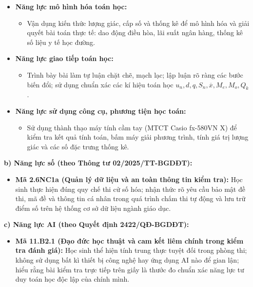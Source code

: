 \documentclass[12pt, a4paper]{article}
\begin{document}
\begin{itemize}[leftmargin=1.5em]
\begin{itemize}
        \item Đọc hiểu bảng tần số ghép nhóm, xác định nhóm chứa trung vị, tứ phân vị, mốt và tính toán chính xác giá trị bằng công thức nội suy.
        \item Quản lý và phân bổ thời gian làm bài thi 90 phút hiệu quả giữa phần trắc nghiệm (70\%) và tự luận (30\%).
    \end{itemize}
    \item \textbf{Năng lực mô hình hóa toán học:}
    \begin{itemize}
        \item Vận dụng kiến thức lượng giác, cấp số và thống kê để mô hình hóa và giải quyết bài toán thực tế: dao động điều hòa, lãi suất ngân hàng, thống kê số liệu y tế học đường.
    \end{itemize}
    \item \textbf{Năng lực giao tiếp toán học:}
    \begin{itemize}
        \item Trình bày bài làm tự luận chặt chẽ, mạch lạc; lập luận rõ ràng các bước biến đổi; sử dụng chuẩn xác các kí hiệu toán học $u_n, d, q, S_n, \overline{x}, M_e, M_o, Q_k$.
    \end{itemize}
    \item \textbf{Năng lực sử dụng công cụ, phương tiện học toán:}
    \begin{itemize}
        \item Sử dụng thành thạo máy tính cầm tay (MTCT Casio fx-580VN X) để kiểm tra kết quả tính toán, bấm máy giải phương trình, tính giá trị lượng giác và các số đặc trưng thống kê.
    \end{itemize}
\end{itemize}

\textbf{b) Năng lực số (theo Thông tư 02/2025/TT-BGDĐT):}
\begin{itemize}[leftmargin=1.5em]
    \item \textbf{Mã 2.6NC1a (Quản lý dữ liệu và an toàn thông tin kiểm tra):} Học sinh thực hiện đúng quy chế thi cử số hóa; nhận thức rõ yêu cầu bảo mật đề thi, mã đề và thông tin cá nhân trong quá trình chấm thi tự động và lưu trữ điểm số trên hệ thống cơ sở dữ liệu ngành giáo dục.
\end{itemize}

\textbf{c) Năng lực AI (theo Quyết định 2422/QĐ-BGDĐT):}
\begin{itemize}[leftmargin=1.5em]
    \item \textbf{Mã 11.B2.1 (Đạo đức học thuật và cam kết liêm chính trong kiểm tra đánh giá):} Học sinh thể hiện tính trung thực tuyệt đối trong phòng thi; không sử dụng bất kì thiết bị công nghệ hay ứng dụng AI nào để gian lận; hiểu rằng bài kiểm tra trực tiếp trên giấy là thước đo chuẩn xác năng lực tư duy toán học độc lập của chính mình.
\end{itemize}
\end{document}
